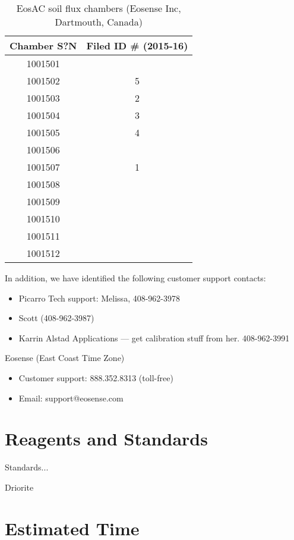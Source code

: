 \documentclass[12pt]{../SOP3}\usepackage[]{graphicx}\usepackage[]{color}
\begin{document}
\begin{table}
\caption{EosAC soil flux chambers (Eosense Inc, Dartmouth, Canada)}
\begin{tabular}{cc} \hline
Chamber S?N   & Filed ID \# (2015-16)  \\ \hline\hline
1001501       &         \\
1001502       &  5       \\
1001503       &  2       \\
1001504       &   3      \\
1001505       &   4      \\
1001506       &         \\
1001507       &  1       \\
1001508       &         \\
1001509       &         \\
1001510       &         \\
1001511       &         \\
1001512       &         \\ \hline
\end{tabular}
\end{table}


\NP In addition, we have identified the following customer support contacts:

\begin{itemize}
  \item Picarro Tech support: Melissa, 408-962-3978
  \item Scott (408-962-3987)
  \item Karrin Alstad Applications --- get calibration stuff from her. 408-962-3991
\end{itemize}

\NP Eosense (East Coast Time Zone)

\begin{itemize}
  \item Customer support: 888.352.8313 (toll-free)
  \item Email: support@eosense.com
\end{itemize}

\section{Reagents and Standards}

\NP Standards..\cite{StandardMethods2012}.

\NP Driorite


\section{Estimated Time}
\end{document}
